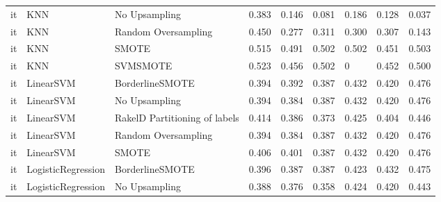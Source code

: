 \begin{tabular}{lllllllll}
      it &                             KNN &                 No Upsampling & 0.383 &                     0.146 &                 0.081 &                  0.186 &                                   0.128 &     0.037 \\
      it &                             KNN &           Random Oversampling & 0.450 &                     0.277 &                 0.311 &                  0.300 &                                   0.307 &     0.143 \\
      it &                             KNN &                         SMOTE & 0.515 &                     0.491 &                 0.502 &                  0.502 &                                   0.451 &     0.503 \\
      it &                             KNN &                      SVMSMOTE & 0.523 &                     0.456 &                 0.502 &                      0 &                                   0.452 &     0.500 \\
      it &                       LinearSVM &               BorderlineSMOTE & 0.394 &                     0.392 &                 0.387 &                  0.432 &                                   0.420 &     0.476 \\
      it &                       LinearSVM &                 No Upsampling & 0.394 &                     0.384 &                 0.387 &                  0.432 &                                   0.420 &     0.476 \\
      it &                       LinearSVM & RakelD Partitioning of labels & 0.414 &                     0.386 &                 0.373 &                  0.425 &                                   0.404 &     0.446 \\
      it &                       LinearSVM &           Random Oversampling & 0.394 &                     0.384 &                 0.387 &                  0.432 &                                   0.420 &     0.476 \\
      it &                       LinearSVM &                         SMOTE & 0.406 &                     0.401 &                 0.387 &                  0.432 &                                   0.420 &     0.476 \\
      it &              LogisticRegression &               BorderlineSMOTE & 0.396 &                     0.387 &                 0.387 &                  0.423 &                                   0.432 &     0.475 \\
      it &              LogisticRegression &                 No Upsampling & 0.388 &                     0.376 &                 0.358 &                  0.424 &                                   0.420 &     0.443 \\

\end{tabular}
